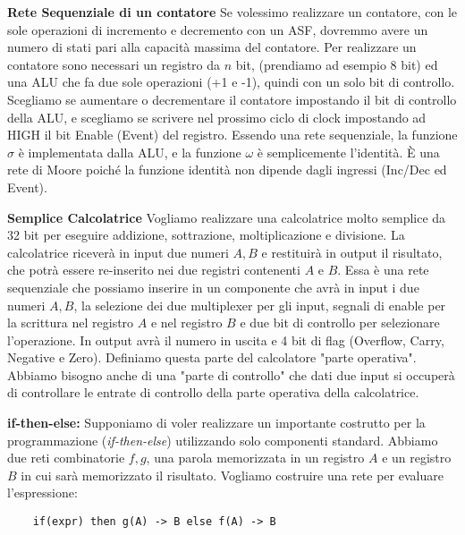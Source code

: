 \begin{exmp}
	\textbf{Rete Sequenziale di un contatore}
	Se volessimo realizzare un contatore, con le sole operazioni di incremento e
	decremento con un ASF, dovremmo avere un numero di stati pari alla capacità
	massima del contatore. Per realizzare un contatore sono necessari un
	registro da $ n $ bit, (prendiamo ad esempio 8 bit) ed una ALU che fa due
	sole operazioni (+1 e -1), quindi con un solo bit di controllo. Scegliamo se
	aumentare o decrementare il contatore impostando il bit di controllo della
	ALU, e scegliamo se scrivere nel prossimo ciclo di clock impostando ad HIGH
	il bit Enable (Event) del registro. Essendo una rete sequenziale, la
	funzione $ \sigma $ è implementata dalla ALU, e la funzione $ \omega $ è
	semplicemente l'identità. È una rete di Moore poiché la funzione identità
	non dipende dagli ingressi (Inc/Dec ed Event).
	
\end{exmp}


\begin{exmp}
	\textbf{Semplice Calcolatrice}
	Vogliamo realizzare una calcolatrice molto semplice da 32 bit per eseguire
	addizione, sottrazione, moltiplicazione e divisione. La calcolatrice
	riceverà in input due numeri $ A,B $ e restituirà in output il risultato,
	che potrà essere re-inserito nei due registri contenenti $ A $ e $ B $. Essa
	è una rete sequenziale che possiamo inserire in un componente che avrà in
	input i due numeri $ A,B $, la selezione dei due multiplexer per gli input,
	segnali di enable per la scrittura nel registro $ A $ e nel registro $ B $ e
	due bit di controllo per selezionare l'operazione. In output avrà il numero
	in uscita e 4 bit di flag (Overflow, Carry, Negative e Zero). Definiamo
	questa parte del calcolatore "parte operativa". Abbiamo bisogno anche di una
	"parte di controllo" che dati due input si occuperà di controllare le
	entrate di controllo della parte operativa della calcolatrice.
	
\end{exmp}


\begin{defn}
	\textbf{if-then-else:}
	Supponiamo di voler realizzare un importante costrutto per la programmazione
	(\textit{if-then-else}) utilizzando solo componenti standard. Abbiamo due
	reti combinatorie $ f,g $, una parola memorizzata in un registro $ A $ e un
	registro $ B $ in cui sarà memorizzato il risultato. Vogliamo costruire una
	rete per evaluare l'espressione:

	\begin{Verbatim}
	if(expr) then g(A) -> B else f(A) -> B
	\end{Verbatim}
	
\end{defn}

